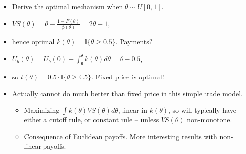 \documentclass[english,handout,10pt]{beamer}		%
\def\lyxframeend{} %
\begin{document}
\begin{itemize}[<+->]
	\item Derive the optimal mechanism when $\theta \sim U[0,1]$.
	\item $VS(\theta) = \theta - \frac{1-F(\theta)}{\phi(\theta)} = 2 \theta - 1$,
	\item hence optimal $k(\theta) = \mathbb{I} \{\theta \geq 0.5 \}$. Payments?
	\item $U_b (\theta) = U_b(0) + \int_0^\theta k(\theta) d\theta = \theta - 0.5$,
	\item so $t(\theta) = 0.5 \cdot \mathbb{I} \{\theta \geq 0.5 \}$. Fixed price is optimal!
	\item Actually cannot do much better than fixed price in this simple trade model.
	\begin{itemize}
		\item Maximizing $\int k(\theta) VS(\theta) d\theta$, linear in $k(\theta)$, so will typically have either a cutoff rule, or constant rule -- unless $VS(\theta)$ non-monotone.
		\item Consequence of Euclidean payoffs. More interesting results with non-linear payoffs.
	\end{itemize}
\end{itemize}
\lyxframeend


%
%
%
%
%
\end{document}
